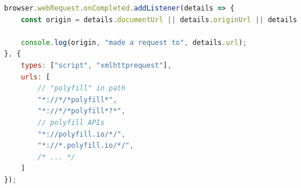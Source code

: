 \filbreak{}

\begin{lstlisting}[language=JavaScript,label={lst.requestfilter},caption={Detecting external polyfill libraries through known \ac{url} patterns}]
browser.webRequest.onCompleted.addListener(details => {
    const origin = details.documentUrl || details.originUrl || details.initiator;

    console.log(origin, "made a request to", details.url);
}, {
    types: ["script", "xmlhttprequest"],
    urls: [
        // "polyfill" in path
        "*://*/*polyfill*",
        "*://*/*polyfill*?*",
        // polyfill APIs
        "*://polyfill.io/*/",
        "*://*.polyfill.io/*/",
        /* ... */
    ]
});
\end{lstlisting}
